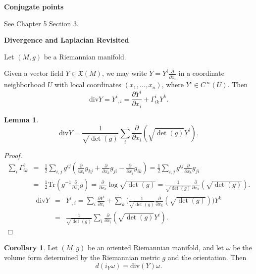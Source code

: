 \documentclass{amsart}
\numberwithin{equation}{section}
\newcommand{\fX}{\mathfrak{X}}
\theoremstyle{definition}
\theoremstyle{theorem}
\newtheorem{corollary}[definition]{Corollary}
\newtheorem{lemma}[definition]{Lemma}
\begin{document}
\noindent
{\bf \large Conjugate points} 

See \cite{dC} Chapter 5  Section 3. 


\bigskip


\noindent
{\bf \large Divergence and Laplacian Revisited}

Let $(M,g)$ be a Riemannian manifold.

Given a vector field $Y\in \fX(M)$, we may write $Y= Y^i\frac{\partial}{\partial x_i}$
in a coordinate neighborhood $U$ with local coordinates $(x_1,\ldots,x_n)$, where $Y^i\in C^\infty(U)$.
Then
$$
\mathrm{div} Y = {Y^i}_{,i}=\frac{\partial Y^i}{\partial x_i}+\Gamma^i_{ik} Y^k.
$$
\begin{lemma}\label{divergence-local}
$$
\mathrm{div} Y =\frac{1}{\sqrt{ \det(g) }}\sum_i \frac{\partial}{\partial x_i}(\sqrt{\det(g)} Y^i).
$$
\end{lemma}

\begin{proof}
\begin{eqnarray*}
\sum_i \Gamma_{ik}^i &=& \frac{1}{2}\sum_{i,j} g^{ij}(\frac{\partial}{\partial x_i} g_{kj}
+\frac{\partial}{\partial x_k} g_{ji}-\frac{\partial}{\partial x_j} g_{ik})= \frac{1}{2}\sum_{i,j} g^{ij} \frac{\partial}{\partial x_k} g_{ji}\\
&=& \frac{1}{2}\mathrm{Tr}(g^{-1}\frac{\partial}{\partial x_k} g)
=\frac{\partial}{\partial x_k}\log\sqrt{\det(g)} 
=\frac{1}{\sqrt{\det(g)}}\frac{\partial}{\partial x_k}(\sqrt{\det(g)}).
\end{eqnarray*}
\begin{eqnarray*}
\mathrm{div} Y &=& {Y^i}_{,i}= \sum_i \frac{\partial Y^i}{\partial x_i}+ \sum_k\Big(\frac{1}{\sqrt{\det(g)}}\frac{\partial}{\partial x_k}(\sqrt{\det(g)}) \Big) Y^k\\
&=& \frac{1}{\sqrt{ \det(g) }}\sum_i \frac{\partial}{\partial x_i}(\sqrt{\det(g)} Y^i).
\end{eqnarray*}
\end{proof}

\begin{corollary}
Let $(M,g)$ be an oriented Riemannian manifold, and let $\omega$ be the volume form determined by the Riemannian  metric $g$ and the orientation.
Then 
\begin{equation}\label{eqn:d-i-omega-div}
d(i_Y\omega) = \mathrm{div}(Y)\omega.
\end{equation}
\end{corollary}
\end{document}
